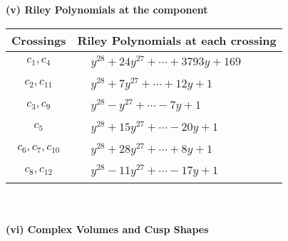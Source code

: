 \documentclass[1p]{elsarticle_modified}
\theoremstyle{definition}
\begin{document}
\newpage\renewcommand{\arraystretch}{1}
\flushleft \textbf{(v) Riley Polynomials at the component}\newline \\
\begin{tabular}{m{50pt}|m{274pt}}
Crossings & \hspace{64pt}Riley Polynomials at each crossing \\
\hline $$\begin{aligned}c_{1},c_{4}\end{aligned}$$&$\begin{aligned}
&y^{28}+24 y^{27}+\cdots+3793 y+169
\end{aligned}$\\
\hline $$\begin{aligned}c_{2},c_{11}\end{aligned}$$&$\begin{aligned}
&y^{28}+7 y^{27}+\cdots+12 y+1
\end{aligned}$\\
\hline $$\begin{aligned}c_{3},c_{9}\end{aligned}$$&$\begin{aligned}
&y^{28}- y^{27}+\cdots-7 y+1
\end{aligned}$\\
\hline $$\begin{aligned}c_{5}\end{aligned}$$&$\begin{aligned}
&y^{28}+15 y^{27}+\cdots-20 y+1
\end{aligned}$\\
\hline $$\begin{aligned}c_{6},c_{7},c_{10}\end{aligned}$$&$\begin{aligned}
&y^{28}+28 y^{27}+\cdots+8 y+1
\end{aligned}$\\
\hline $$\begin{aligned}c_{8},c_{12}\end{aligned}$$&$\begin{aligned}
&y^{28}-11 y^{27}+\cdots-17 y+1
\end{aligned}$\\
\hline
\end{tabular}\\~\\
\newpage\flushleft \textbf{(vi) Complex Volumes and Cusp Shapes}
\end{document}
